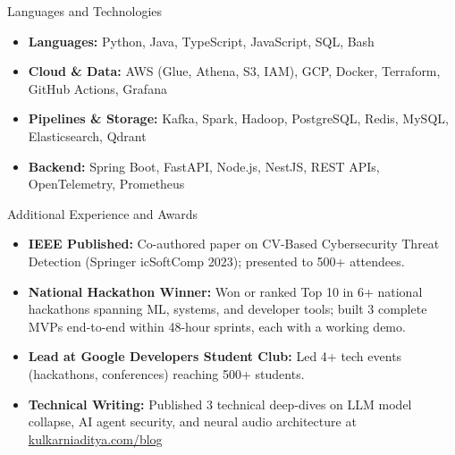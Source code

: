 \documentclass[]{mcdowellcv}
\begin{document}
\begin{cvsection}{Languages and Technologies}
  \begin{cvsubsection}{}{}{}
    \begin{itemize}
      \item \textbf{Languages:} Python, Java, TypeScript, JavaScript, SQL, Bash
      \item \textbf{Cloud \& Data:} AWS (Glue, Athena, S3, IAM), GCP, Docker, Terraform, GitHub Actions, Grafana
      \item \textbf{Pipelines \& Storage:} Kafka, Spark, Hadoop, PostgreSQL, Redis, MySQL, Elasticsearch, Qdrant
      \item \textbf{Backend:} Spring Boot, FastAPI, Node.js, NestJS, REST APIs, OpenTelemetry, Prometheus
    \end{itemize}
  \end{cvsubsection}
\end{cvsection}

\begin{cvsection}{Additional Experience and Awards}
  \begin{cvsubsection}{}{}{}
    \begin{itemize}
      \item \textbf{IEEE Published:} Co-authored paper on CV-Based Cybersecurity Threat Detection (Springer icSoftComp 2023); presented to 500+ attendees.
      \item \textbf{National Hackathon Winner:} Won or ranked Top 10 in 6+ national hackathons spanning ML, systems, and developer tools; built 3 complete MVPs end-to-end within 48-hour sprints, each with a working demo.
      \item \textbf{Lead at Google Developers Student Club:} Led 4+ tech events (hackathons, conferences) reaching 500+ students.
      \item \textbf{Technical Writing:} Published 3 technical deep-dives on LLM model collapse, AI agent security, and neural audio architecture at \href{https://www.kulkarniaditya.com/blog}{kulkarniaditya.com/blog}
    \end{itemize}
  \end{cvsubsection}
\end{cvsection}
\end{document}
